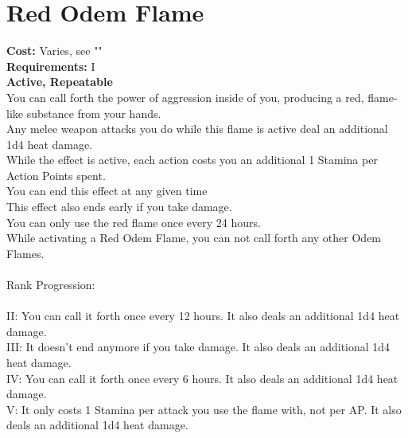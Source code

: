 \section{Red Odem Flame}\label{perk:redOdemFlame}
\textbf{Cost:} Varies, see ""\\
\textbf{Requirements:} I\\
\textbf{Active, Repeatable}\\
You can call forth the power of aggression inside of you, producing a red, flame-like substance from your hands.\\
Any melee weapon attacks you do while this flame is active deal an additional 1d4 heat damage.\\
While the effect is active, each action costs you an additional 1 Stamina per Action Points spent.\\
You can end this effect at any given time\\
This effect also ends early if you take damage.\\
You can only use the red flame once every 24 hours.\\
While activating a Red Odem Flame, you can not call forth any other Odem Flames.\\
\\
Rank Progression:\\
\\
II: You can call it forth once every 12 hours.
It also deals an additional 1d4 heat damage.\\
III: It doesn't end anymore if you take damage.
It also deals an additional 1d4 heat damage.\\
IV: You can call it forth once every 6 hours.
It also deals an additional 1d4 heat damage.\\
V: It only costs 1 Stamina per attack you use the flame with, not per AP.
It also deals an additional 1d4 heat damage.\\